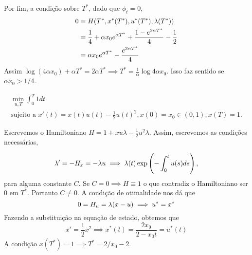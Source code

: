 Por fim, a condição sobre $T^*$, dado que $\phi_t = 0$,
\begin{equation*}
    \begin{split}
        0 &= H(T^*, x^*(T^*), u^*(T^*), \lambda(T^*)) \\
        &= \frac{1}{4} + \alpha x_0e^{\alpha T^*} + \frac{1 -e^{2\alpha T^*}}{4} - \frac{1}{2} \\
        &= \alpha x_0e^{\alpha T^*} - \frac{e^{2\alpha T^*}}{4}
    \end{split}
\end{equation*}
Assim $\log(4\alpha x_0) + \alpha T^*= 2 \alpha T^* \implies  T^* =
\frac{1}{\alpha}\log{4\alpha x_0}$. Isso faz sentido se $\alpha x_0 > 1/4$. 

\begin{example}
    \begin{gather*}
        \min_{u,T} \int_0^T 1 dt \\ 
        \text{sujeito a   }x'(t) = x(t)u(t)  - \frac{1}{2}u(t)^2, x(0) = x_0 \in (0,1), x(T) = 1.
    \end{gather*}
\end{example}

Escrevemos o Hamiltoniano $H = 1 + xu\lambda - \frac{1}{2}u^2\lambda$. Assim,
escrevemos as condições necessárias, 

$$
\lambda ' = -H_x = - \lambda u \implies \lambda(t)\exp\left(-\int_0^t u(s)ds \right), 
$$
para alguma constante $C$. Se $C = 0 \implies H \equiv 1$ o que contradiz o
Hamiltoniano ser $0$ em $T^*$. Portanto $C \neq 0$. A condição de otimalidade
nos dá que 
$$
0 = H_u = \lambda(x - u) \implies u^* = x^*
$$
Fazendo a substituição na equação de estado, obtemos que 
$$
x' = \frac{1}{2}x^2 \implies x^*(t) = \frac{2x_0}{2 - x_0 t} = u^*(t)
$$
A condição $x(T^*) = 1 \implies T^* = 2/x_0 - 2$.  
